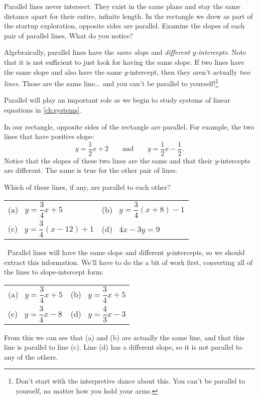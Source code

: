Parallel lines never intersect. They exist in the same plane and stay the same distance apart for their entire, infinite length. In the rectangle we drew as part of the startup exploration, opposite sides are parallel. Examine the slopes of each pair of parallel lines. What do you notice?

Algebraically, parallel lines have the \textit{same slope} and \textit{different $y$-intercepts}. Note that it is not sufficient to just look for having the same slope. If two lines have the same slope and also have the same $y$-intercept, then they aren't actually \textit{two lines}. Those are the same line\ldots\ and you can't be parallel to yourself!\footnote{Don't start with the interpretive dance about this. You can't be parallel to yourself, no matter how you hold your arms.}

Parallel will play an important role as we begin to study systems of linear equations in \cref{ch:systems}.

In our rectangle, opposite sides of the rectangle are parallel. For example, the two lines that have positive slope: \[y=\frac{1}{2}x+2 \qquad\text{and}\qquad y=\frac{1}{2}x-\frac{1}{2}.\] Notice that the slopes of these two lines are the same and that their $y$-intercepts are different. The same is true for the other pair of lines.

\begin{boxedex}
Which of these lines, if any, are parallel to each other?

\begin{center}
\begin{tabularx}{0.8\linewidth}{XX}
(a)~ $y=\dfrac{3}{4}x+5$
&
(b)~ $y=\dfrac{3}{4}(x+8)-1$
\\[3ex]
(c)~ $y=\dfrac{3}{4}(x-12)+1$
&
(d)~ $4x-3y=9$
\end{tabularx}
\end{center}

\exsoln\ Parallel lines will have the same slope and different $y$-intercepts, so we should extract this information. We'll have to do the a bit of work first, converting all of the lines to slope-intercept form:
\begin{center}
\begin{tabularx}{0.8\linewidth}{XX}
(a)~ $y=\dfrac{3}{4}x+5$
&
(b)~ $y=\dfrac{3}{4}x+5$
\\[3ex]
(c)~ $y=\dfrac{3}{4}x-8$
&
(d)~ $y=\dfrac{4}{3}x-3$
\end{tabularx}
\end{center}
From this we can see that (a) and (b) are actually the same line, and that this line is parallel to line (c). Line (d) has a different slope, so it is not parallel to any of the others.
\end{boxedex}

